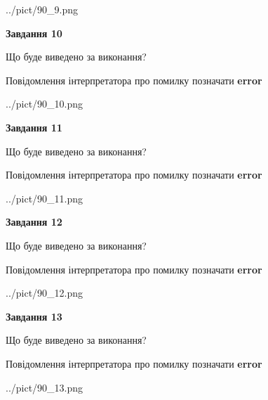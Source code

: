 \documentclass[11pt, ukrainian]{article}
\begin{document}
{\begin {large}
\begin{center}
	{../pict/90_9.png}
\end{center}
\newpage

{\begin {center}\textbf{Завдання 10}\end {center}}\par
Що буде виведено за виконання? \par
Повідомлення інтерпретатора про помилку позначати \textbf{error}

\begin{center}
	{../pict/90_10.png}
\end{center}
\newpage

{\begin {center}\textbf{Завдання 11}\end {center}}\par
Що буде виведено за виконання? \par
Повідомлення інтерпретатора про помилку позначати \textbf{error}

\begin{center}
	{../pict/90_11.png}
\end{center}
\newpage

{\begin {center}\textbf{Завдання 12}\end {center}}\par
Що буде виведено за виконання? \par
Повідомлення інтерпретатора про помилку позначати \textbf{error}

\begin{center}
	{../pict/90_12.png}
\end{center}
\newpage

{\begin {center}\textbf{Завдання 13}\end {center}}\par
Що буде виведено за виконання? \par
Повідомлення інтерпретатора про помилку позначати \textbf{error}

\begin{center}
	{../pict/90_13.png}
\end{center}
\newpage


\end{large}}
\end{document}
